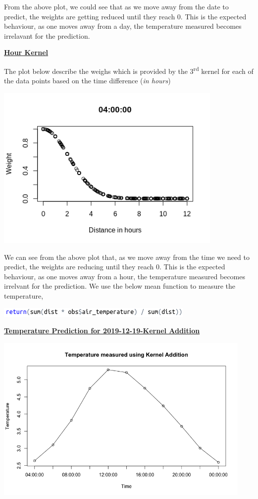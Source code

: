 \documentclass[a4paper,10pt]{article}
\begin{document}
From the above plot, we could see that as we move away from the date to predict, the weights are getting reduced until they reach 0. This is the expected behaviour,
as one moves away from a day, the temperature measured becomes irrelavant for the prediction.
\par
\vspace{0.5cm}
\textbf{\underline{Hour Kernel}} \par
The plot below describe the weighs which is provided by the 3\textsuperscript{rd} kernel for each of the data points based on the time difference (\textit{in hours})
\begin{center}
  \includegraphics[width=110mm,scale=0.10]{Weights_hour.png}
\end{center}
We can see from the above plot that, as we move away from the time we need to predict, the weights are reducing until they reach 0. This is the expected behaviour,
as one moves away from a hour, the temperature measured becomes irrelvant for the prediction.
\newpage
We use the below mean function to measure the temperature,
\begin{center}
  \includegraphics{mean.png}
\end{center} \par
\textbf{\underline{Temperature Prediction for 2019-12-19-Kernel Addition}}
\begin{center}
  \includegraphics[width=125mm,scale=0.10]{Temp_1_Measured.png}
\end{center}
\end{document}
